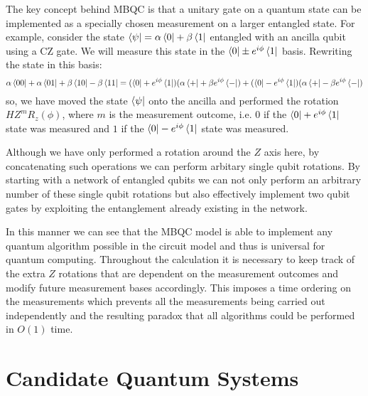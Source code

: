 The key concept behind MBQC is that a unitary gate on a quantum state can be implemented as a specially chosen measurement on a larger entangled state. For example, consider the state $\left\langle \psi\right\vert=\alpha\left\langle 0\right\vert+\beta\left\langle 1\right\vert$ entangled with an ancilla qubit using a CZ gate. We will measure this state in the $\left\langle 0\right\vert\pm e^{i\phi}\left\langle 1\right\vert$ basis. Rewriting the state in this basis:
\begin{equation}
\alpha\left\langle 00\right\vert+\alpha\left\langle 01\right\vert+\beta\left\langle 10\right\vert-\beta\left\langle 11\right\vert=(\left\langle 0\right\vert+e^{i\phi}\left\langle 1\right\vert)(\alpha\left\langle +\right\vert+\beta e^{i\phi}\left\langle -\right\vert)+(\left\langle 0\right\vert-e^{i\phi}\left\langle 1\right\vert)(\alpha\left\langle +\right\vert-\beta e^{i\phi}\left\langle -\right\vert)
\end{equation}
so, we have moved the state $\left\langle \psi\right\vert$ onto the ancilla and performed the rotation $HZ^{m}R_{z}(\phi)$, where $m$ is the measurement outcome, i.e. $0$ if the $\left\langle 0\right\vert+e^{i\phi}\left\langle 1\right\vert$ state was measured and $1$ if the $\left\langle 0\right\vert-e^{i\phi}\left\langle 1\right\vert$ state was measured.

Although we have only performed a rotation around the $Z$ axis here, by concatenating such operations we can perform arbitary single qubit rotations. By starting with a network of entangled qubits we can not only perform an arbitrary number of these single qubit rotations but also effectively implement two qubit gates by exploiting the entanglement already existing in the network.

In this manner we can see that the MBQC model is able to implement any quantum algorithm possible in the circuit model and thus is universal for quantum computing. Throughout the calculation it is necessary to keep track of the extra $Z$ rotations that are dependent on the measurement outcomes and modify future measurement bases accordingly. This imposes a time ordering on the measurements which prevents all the measurements being carried out independently and the resulting paradox that all algorithms could be performed in $O(1)$ time.  

\section{Candidate Quantum Systems}
